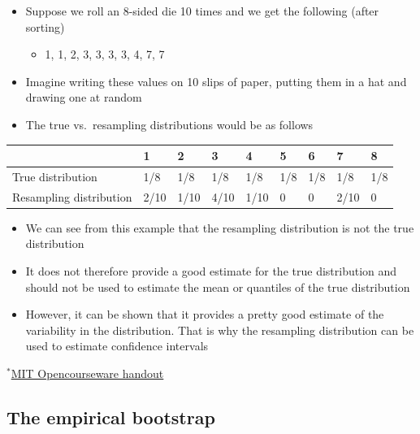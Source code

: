 \documentclass[
]{book}
\providecommand{\tightlist}{%
  \setlength{\itemsep}{0pt}\setlength{\parskip}{0pt}}
\begin{document}
\begin{itemize}
\tightlist
\item
  Suppose we roll an 8-sided die 10 times and we get the following (after sorting)

  \begin{itemize}
  \tightlist
  \item
    1, 1, 2, 3, 3, 3, 3, 4, 7, 7
  \end{itemize}
\item
  Imagine writing these values on 10 slips of paper, putting them in a hat and drawing one at random
\item
  The true vs.~resampling distributions would be as follows
\end{itemize}

\begin{tabular}{l|l|l|l|l|l|l|l|l}
\hline
    &    1 &    2 &    3 &    4 &    5 &    6 &    7 &    8\\
\hline
True distribution & 1/8 & 1/8 & 1/8 & 1/8 & 1/8 & 1/8 & 1/8 & 1/8\\
\hline
Resampling distribution & 2/10 & 1/10 & 4/10 & 1/10 & 0 & 0 & 2/10 & 0\\
\hline
\end{tabular}

\begin{itemize}
\tightlist
\item
  We can see from this example that the resampling distribution is not the true distribution
\item
  It does not therefore provide a good estimate for the true distribution and should not be used to estimate the mean or quantiles of the true distribution
\item
  However, it can be shown that it provides a pretty good estimate of the variability in the distribution. That is why the resampling distribution can be used to estimate confidence intervals
\end{itemize}

\(^*\)\href{https://ocw.mit.edu/courses/mathematics/18-05-introduction-to-probability-and-statistics-spring-2014/readings/MIT18_05S14_Reading24.pdf}{MIT Opencourseware handout}

\hypertarget{the-empirical-bootstrap}{%
\subsection{The empirical bootstrap}\label{the-empirical-bootstrap}}
\end{document}
